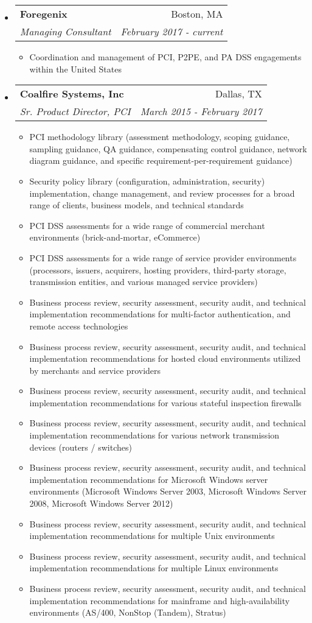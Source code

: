 \documentclass[letterpaper,11pt]{article}
\makeatletter
\newcommand{\resitem}[1]{\item #1 \vspace{-2pt}}
\newcommand{\ressubheading}[4]{
\begin{tabular*}{6.5in}{l@{\cftdotfill{\cftsecdotsep}\extracolsep{\fill}}r}
		\textbf{#1} & #2 \\
		\textit{#3} & \textit{#4} \\
\end{tabular*}\vspace{-6pt}}
\makeatother
\begin{document}
\begin{itemize}

\item
	\ressubheading{Foregenix}{Boston, MA}{Managing Consultant}{February 2017 - current}
	\begin{itemize}
      \resitem{Coordination and management of PCI, P2PE, and PA DSS engagements within the United States}
	\end{itemize}

\item
	\ressubheading{Coalfire Systems, Inc}{Dallas, TX}{Sr. Product Director, PCI}{March 2015 - February 2017}
	\begin{itemize}
            \resitem{PCI methodology library (assessment methodology, scoping guidance, sampling guidance, QA guidance, compensating control guidance, network diagram guidance, and specific requirement-per-requirement guidance)}
            \resitem{Security policy library (configuration, administration, security) implementation, change management, and review processes for a broad range of clients, business models, and technical standards}
            \resitem{PCI DSS assessments for a wide range of commercial merchant environments (brick-and-mortar, eCommerce)}
            \resitem{PCI DSS assessments for a wide range of service provider environments (processors, issuers, acquirers, hosting providers, third-party storage, transmission entities, and various managed service providers)}
            \resitem{Business process review, security assessment, security audit, and technical implementation recommendations for multi-factor authentication, and remote access technologies}
            \resitem{Business process review, security assessment, security audit, and technical implementation recommendations for hosted cloud environments utilized by merchants and service providers}
            \resitem{Business process review, security assessment, security audit, and technical implementation recommendations for various stateful inspection firewalls}
            \resitem{Business process review, security assessment, security audit, and technical implementation recommendations for various network transmission devices (routers / switches)}
            \resitem{Business process review, security assessment, security audit, and technical implementation recommendations for Microsoft Windows server environments (Microsoft Windows Server 2003, Microsoft Windows Server 2008, Microsoft Windows Server 2012)}
            \resitem{Business process review, security assessment, security audit, and technical implementation recommendations for multiple Unix environments}
            \resitem{Business process review, security assessment, security audit, and technical implementation recommendations for multiple Linux environments}
            \resitem{Business process review, security assessment, security audit, and technical implementation recommendations for mainframe and high-availability environments (AS/400, NonStop (Tandem), Stratus)}
	\end{itemize}


\end{itemize}
\end{document}
